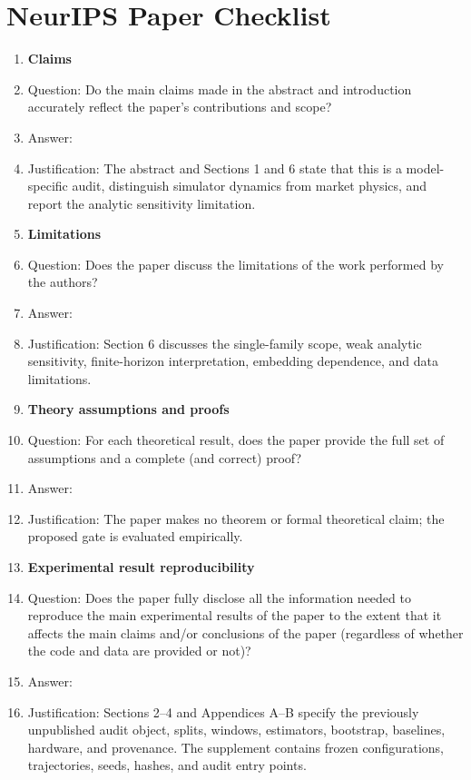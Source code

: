 \section*{NeurIPS Paper Checklist}

\begin{enumerate}

\item {\bf Claims}
    \item[] Question: Do the main claims made in the abstract and introduction accurately reflect the paper's contributions and scope?
    \item[] Answer: \answerYes{}
    \item[] Justification: The abstract and Sections 1 and 6 state that this is a model-specific audit, distinguish simulator dynamics from market physics, and report the analytic sensitivity limitation.

\item {\bf Limitations}
    \item[] Question: Does the paper discuss the limitations of the work performed by the authors?
    \item[] Answer: \answerYes{}
    \item[] Justification: Section 6 discusses the single-family scope, weak analytic sensitivity, finite-horizon interpretation, embedding dependence, and data limitations.

\item {\bf Theory assumptions and proofs}
    \item[] Question: For each theoretical result, does the paper provide the full set of assumptions and a complete (and correct) proof?
    \item[] Answer: \answerNA{}
    \item[] Justification: The paper makes no theorem or formal theoretical claim; the proposed gate is evaluated empirically.

\item {\bf Experimental result reproducibility}
    \item[] Question: Does the paper fully disclose all the information needed to reproduce the main experimental results of the paper to the extent that it affects the main claims and/or conclusions of the paper (regardless of whether the code and data are provided or not)?
    \item[] Answer: \answerYes{}
    \item[] Justification: Sections 2--4 and Appendices A--B specify the previously unpublished audit object, splits, windows, estimators, bootstrap, baselines, hardware, and provenance. The supplement contains frozen configurations, trajectories, seeds, hashes, and audit entry points.


\end{enumerate}

